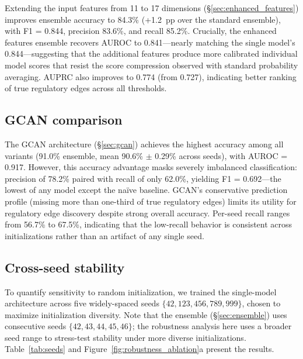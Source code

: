 \documentclass[10pt,twocolumn]{article}
\begin{document}
Extending the input features from 11 to 17 dimensions (\S\ref{sec:enhanced_features}) improves ensemble accuracy to 84.3\% (+1.2~pp over the standard ensemble), with F1 = 0.844, precision 83.6\%, and recall 85.2\%.
Crucially, the enhanced features ensemble recovers AUROC to 0.841---nearly matching the single model's 0.844---suggesting that the additional features produce more calibrated individual model scores that resist the score compression observed with standard probability averaging.
AUPRC also improves to 0.774 (from 0.727), indicating better ranking of true regulatory edges across all thresholds.

\subsection{GCAN comparison}
\label{sec:gcan_results}

The GCAN architecture (\S\ref{sec:gcan}) achieves the highest accuracy among all variants (91.0\% ensemble, mean 90.6\% $\pm$ 0.29\% across seeds), with AUROC = 0.917.
However, this accuracy advantage masks severely imbalanced classification: precision of 78.2\% paired with recall of only 62.0\%, yielding F1 = 0.692---the lowest of any model except the na\"{i}ve baseline.
GCAN's conservative prediction profile (missing more than one-third of true regulatory edges) limits its utility for regulatory edge discovery despite strong overall accuracy.
Per-seed recall ranges from 56.7\% to 67.5\%, indicating that the low-recall behavior is consistent across initializations rather than an artifact of any single seed.

\subsection{Cross-seed stability}
\label{sec:robustness}

To quantify sensitivity to random initialization, we trained the single-model architecture across five widely-spaced seeds $\{42, 123, 456, 789, 999\}$, chosen to maximize initialization diversity.
Note that the ensemble (\S\ref{sec:ensemble}) uses consecutive seeds $\{42, 43, 44, 45, 46\}$; the robustness analysis here uses a broader seed range to stress-test stability under more diverse initializations.
Table~\ref{tab:seeds} and Figure~\ref{fig:robustness_ablation}a present the results.
\end{document}

